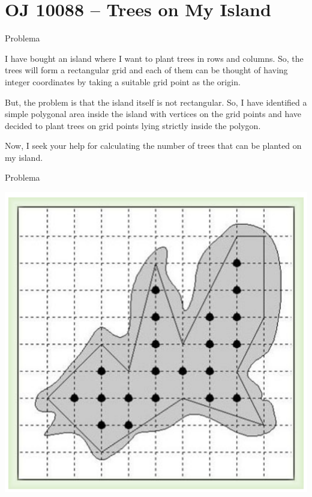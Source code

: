 \section{OJ 10088 -- Trees on My Island}

\begin{frame}[fragile]{Problema}

I have bought an island where I want to plant trees in rows and columns. So, the trees will
form a rectangular grid and each of them can be thought of having integer coordinates by taking
a suitable grid point as the origin.

But, the problem is that the island itself is not rectangular. So, I have identified a simple
polygonal area inside the island with vertices on the grid points and have decided to plant trees
on grid points lying strictly inside the polygon.

Now, I seek your help for calculating the number of trees that can be planted on my island.

\end{frame}

\begin{frame}[fragile]{Problema}

\begin{center}
\includegraphics[scale=0.8]{figure.png}
\end{center}

\end{frame}

